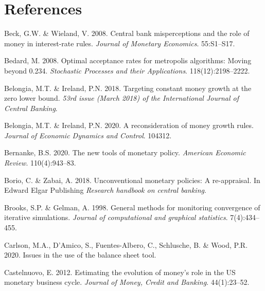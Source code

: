 \documentclass[11pt,preprint, authoryear]{elsarticle}
\numberwithin{equation}{section}
\numberwithin{figure}{section}
\numberwithin{table}{section}
\newlength{\cslhangindent}
\newenvironment{CSLReferences}%
  {\setlength{\parindent}{0pt}%
  \everypar{\setlength{\hangindent}{\cslhangindent}}\ignorespaces}%
  {\par}
\begin{document}
\hypertarget{references}{%
\section*{References}\label{references}}

\hypertarget{refs}{}
\begin{CSLReferences}{1}{0}
\leavevmode{}%
Beck, G.W. \& Wieland, V. 2008. Central bank misperceptions and the role
of money in interest-rate rules. \emph{Journal of Monetary Economics}.
55:S1--S17.

\leavevmode{}%
Bedard, M. 2008. Optimal acceptance rates for metropolis algorithms:
Moving beyond 0.234. \emph{Stochastic Processes and their Applications}.
118(12):2198--2222.

\leavevmode{}%
Belongia, M.T. \& Ireland, P.N. 2018. Targeting constant money growth at
the zero lower bound. \emph{53rd issue (March 2018) of the International
Journal of Central Banking}.

\leavevmode{}%
Belongia, M.T. \& Ireland, P.N. 2020. A reconsideration of money growth
rules. \emph{Journal of Economic Dynamics and Control}. 104312.

\leavevmode{}%
Bernanke, B.S. 2020. The new tools of monetary policy. \emph{American
Economic Review}. 110(4):943--83.

\leavevmode{}%
Borio, C. \& Zabai, A. 2018. Unconventional monetary policies: A
re-appraisal. In Edward Elgar Publishing \emph{Research handbook on
central banking}.

\leavevmode{}%
Brooks, S.P. \& Gelman, A. 1998. General methods for monitoring
convergence of iterative simulations. \emph{Journal of computational and
graphical statistics}. 7(4):434--455.

\leavevmode{}%
Carlson, M.A., D'Amico, S., Fuentes-Albero, C., Schlusche, B. \& Wood,
P.R. 2020. Issues in the use of the balance sheet tool.

\leavevmode{}%
Castelnuovo, E. 2012. Estimating the evolution of money's role in the US
monetary business cycle. \emph{Journal of Money, Credit and Banking}.
44(1):23--52.


\end{CSLReferences}
\end{document}
